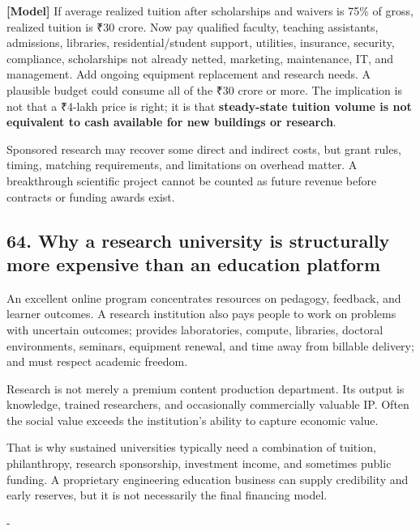 \textbf{\textbf{[Model]}} If average realized tuition after scholarships and waivers is 75\% of gross, realized tuition is \textnormal{₹}30 crore. Now pay qualified faculty, teaching assistants, admissions, libraries, residential/\allowbreak student support, utilities, insurance, security, compliance, scholarships not already netted, marketing, maintenance, IT, and management. Add ongoing equipment replacement and research needs. A plausible budget could consume all of the \textnormal{₹}30 crore or more. The implication is not that a \textnormal{₹}4-lakh price is right; it is that \textbf{steady-state tuition volume is not equivalent to cash available for new buildings or research}.

Sponsored research may recover some direct and indirect costs, but grant rules, timing, matching requirements, and limitations on overhead matter. A breakthrough scientific project cannot be counted as future revenue before contracts or funding awards exist.

\subsection{64. Why a research university is structurally more expensive than an education platform}

An excellent online program concentrates resources on pedagogy, feedback, and learner outcomes. A research institution also pays people to work on problems with uncertain outcomes; provides laboratories, compute, libraries, doctoral environments, seminars, equipment renewal, and time away from billable delivery; and must respect academic freedom.

Research is not merely a premium content production department. Its output is knowledge, trained researchers, and occasionally commercially valuable IP. Often the social value exceeds the institution's ability to capture economic value.

That is why sustained universities typically need a combination of tuition, philanthropy, research sponsorship, investment income, and sometimes public funding. A proprietary engineering education business can supply credibility and early reserves, but it is not necessarily the final financing model.

-


